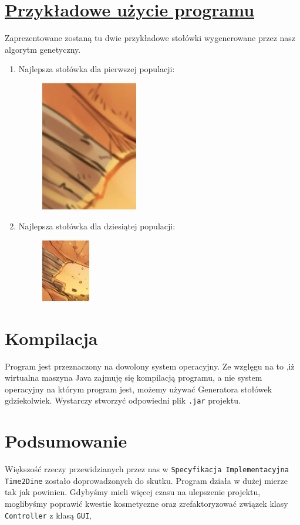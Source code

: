 \documentclass{article}
\begin{document}
\section{\underline{Przykładowe użycie programu}}
\indent Zaprezentowane zostaną tu dwie przykładowe stołówki wygenerowane przez nasz algorytm genetyczny.
\begin{enumerate}
	\item Najlepsza stołówka dla pierwszej populacji:
\begin{figure}[h]
\hspace*{-2.8cm} 
\includegraphics[width=0.4\textwidth]{stolowka1.png}
\end{figure}
\newpage
\item Najlepsza stołówka dla dziesiątej populacji:
\begin{figure}[h]
\hspace*{2.4cm} 
\includegraphics[width=0.2\textwidth]{stolowka2.png}
\end{figure}

\end{enumerate}
\section{Kompilacja}
Program jest przeznaczony na dowolony system operacyjny. Ze wzglęgu na to ,iż wirtualna maszyna Java zajmuję się kompilacją programu, a nie system operacyjny na którym program jest, możemy używać Generatora stołówek gdziekolwiek. Wystarczy stworzyć odpowiedni plik \verb |.jar| projektu. 

\section{Podsumowanie}
Większość rzeczy przewidzianych przez nas w \verb|Specyfikacja Implementacyjna Time2Dine| zostało doprowadzonych do skutku. Program działa w dużej mierze tak jak powinien. Gdybyśmy mieli więcej czasu na ulepszenie projektu, moglibyśmy poprawić kwestie kosmetyczne oraz zrefaktoryzować związek klasy \verb|Controller| z klasą \verb|GUI|,
\end{document}
